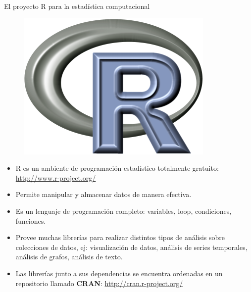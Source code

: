 \documentclass[handout]{beamer}
\begin{document}
\begin{frame}{El proyecto R para la estadística computacional}
\begin{figure}[h!]
	\centering
	\includegraphics[scale=0.6]{pics/Rlogo.png}
\end{figure}
\scriptsize{
\begin{itemize}
 \item R es un ambiente de programación estadístico totalmente gratuito: \url{http://www.r-project.org/}
 \item Permite manipular y almacenar datos de manera efectiva.
 \item Es un lenguaje de programación completo: variables, loop, condiciones, funciones.
 \item Provee muchas librerías para realizar distintos tipos de análisis sobre colecciones de datos, ej: visualización de datos, análisis de series temporales, análisis de grafos, análisis de texto.
 \item Las librerías junto a sus dependencias se encuentra ordenadas en un repositorio llamado \textbf{CRAN}: \url{http://cran.r-project.org/}

\end{itemize}

}



\end{frame}
\end{document}
